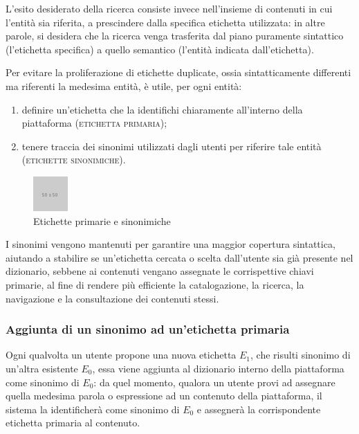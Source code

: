 \documentclass[10pt,a4paper,headinclude,footinclude,hidelinks]{scrreprt} %
\begin{document}
	L'esito desiderato della ricerca consiste invece nell'insieme di contenuti in cui l'entità sia riferita, a prescindere dalla specifica etichetta utilizzata: in altre parole, si desidera che la ricerca venga trasferita dal piano puramente sintattico (l'etichetta specifica) a quello semantico (l'entità indicata dall'etichetta).

	Per evitare la proliferazione di etichette duplicate, ossia sintatticamente differenti ma riferenti la medesima entità, è utile, per ogni entità:
	\begin{enumerate}
	\item definire un'etichetta che la identifichi chiaramente all'interno della piattaforma (\textsc{etichetta primaria});
	\item tenere traccia dei sinonimi utilizzati dagli utenti per riferire tale entità (\textsc{etichette sinonimiche}).
	\end{enumerate}

	\begin{figure}[ht]
		\begin{center}
	    	\includegraphics{../placeholder.png}
			\caption{Etichette primarie e sinonimiche}
		\end{center}
	\end{figure}

	I sinonimi vengono mantenuti per garantire una maggior copertura sintattica, aiutando a stabilire se un'etichetta cercata o scelta dall'utente sia già presente nel dizionario, sebbene ai contenuti vengano assegnate le corrispettive chiavi primarie, al fine di rendere più efficiente la catalogazione, la ricerca, la navigazione e la consultazione dei contenuti stessi.

	\subsubsection{Aggiunta di un sinonimo ad un'etichetta primaria}
	Ogni qualvolta un utente propone una nuova etichetta $E_1$, che risulti sinonimo di un'altra esistente $E_0$, essa viene aggiunta al dizionario interno della piattaforma come sinonimo di $E_0$: da quel momento, qualora un utente provi ad assegnare quella medesima parola o espressione ad un contenuto della piattaforma, il sistema la identificherà come sinonimo di $E_0$ e assegnerà la corrispondente etichetta primaria al contenuto.
\end{document}
